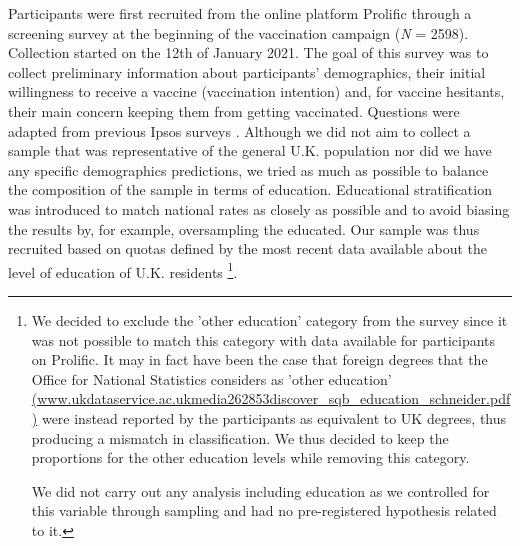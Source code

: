 \documentclass[authordate, empirical]{jote-new-article}
\begin{document}
Participants were first recruited from the online platform Prolific through a screening survey at the beginning of the vaccination campaign (\emph{N }= 2598). Collection started on the 12th of January 2021. The goal of this survey was to collect preliminary information about participants' demographics, their initial willingness to receive a vaccine (vaccination intention) and, for vaccine hesitants, their main concern keeping them from getting vaccinated. Questions were adapted from previous Ipsos surveys \parencites{Boyon2021}. Although we did not aim to collect a sample that was representative of the general U.K. population nor did we have any specific demographics predictions, we tried as much as possible to balance the composition of the sample in terms of education. Educational stratification was introduced to match national rates as closely as possible and to avoid biasing the results by, for example, oversampling the educated. Our sample was thus recruited based on quotas defined by the most recent data available about the level of education of U.K. residents \parencites[][]{forNationalStatistics2019}\footnote{We decided to exclude the 'other education' category from the survey since it was not possible to match this category with data available for participants on Prolific. It may in fact have been the case that foreign degrees that the Office for National Statistics considers as 'other education' \href{https://www.ukdataservice.ac.uk/media/262853/discover_sqb_education_schneider.pdf}{(www.ukdataservice.ac.ukmedia262853discover\_sqb\_education\_schneider.pdf)} were instead reported by the participants as equivalent to UK degrees, thus producing a mismatch in classification. We thus decided to keep the proportions for the other education levels while removing this category.\par We did not carry out any analysis including education as we controlled for this variable through sampling and had no pre-registered hypothesis related to it.}.
\end{document}
